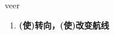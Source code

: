 
\begin{frame}
{\huge veer}
\begin{center}
\begin{enumerate}\Large
  \item \textbf{(使)转向，(使)改变航线}
\end{enumerate}
\end{center}
\end{frame}
